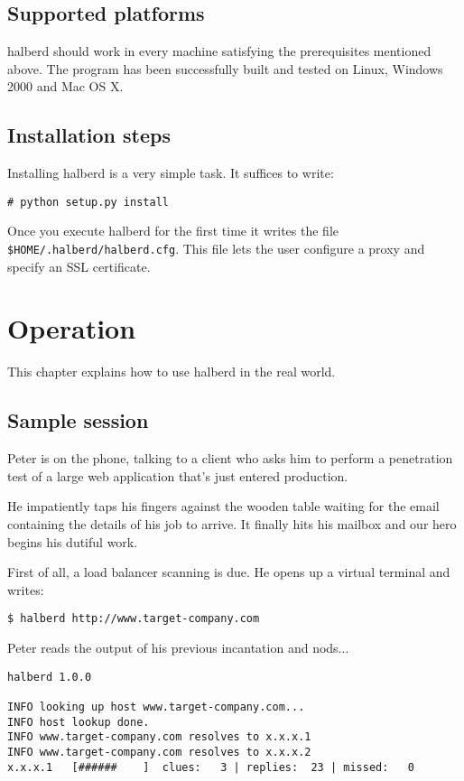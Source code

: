 \documentclass[a4paper]{book}
\begin{document}
\section{Supported platforms}

halberd should work in every machine satisfying the prerequisites mentioned
above.  The program has been successfully built and tested on Linux, Windows
2000 and Mac OS X.

\section{Installation steps}

Installing halberd is a very simple task.  It suffices to write:

\begin{verbatim}
# python setup.py install
\end{verbatim}

Once you execute halberd for the first time it writes the file
\verb|$HOME/.halberd/halberd.cfg|. This file lets the user configure a proxy
and specify an SSL certificate.

\chapter{Operation}

This chapter explains how to use halberd in the real world.

\section{Sample session}

Peter is on the phone, talking to a client who asks him to perform a
penetration test of a large web application that's just entered production.

He impatiently taps his fingers against the wooden table waiting for the email
containing the details of his job to arrive.  It finally hits his mailbox and
our hero begins his dutiful work.

First of all, a load balancer scanning is due.  He opens up a virtual terminal
and writes:

\begin{verbatim}
$ halberd http://www.target-company.com
\end{verbatim}

Peter reads the output of his previous incantation and nods...

\begin{verbatim}
halberd 1.0.0

INFO looking up host www.target-company.com...
INFO host lookup done.
INFO www.target-company.com resolves to x.x.x.1
INFO www.target-company.com resolves to x.x.x.2
x.x.x.1   [######    ]  clues:   3 | replies:  23 | missed:   0
\end{verbatim}
\end{document}
